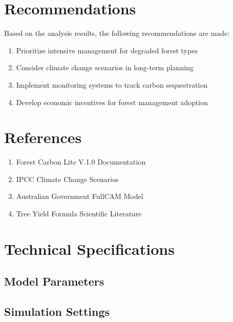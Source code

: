 \documentclass[11pt,a4paper]{article}
\begin{document}
\section{Recommendations}

Based on the analysis results, the following recommendations are made:

\begin{enumerate}
    \item Prioritize intensive management for degraded forest types
    \item Consider climate change scenarios in long-term planning
    \item Implement monitoring systems to track carbon sequestration
    \item Develop economic incentives for forest management adoption
\end{enumerate}

\section{References}

\begin{enumerate}
    \item Forest Carbon Lite V.1.0 Documentation
    \item IPCC Climate Change Scenarios
    \item Australian Government FullCAM Model
    \item Tree Yield Formula Scientific Literature
\end{enumerate}

\appendix

\section{Technical Specifications}

\subsection{Model Parameters}

\subsection{Simulation Settings}
\end{document}

